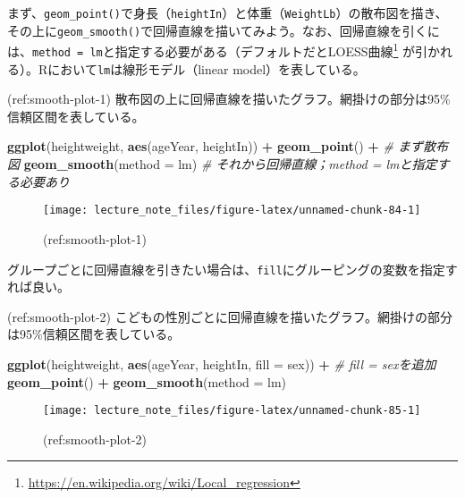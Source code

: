 \documentclass[]{book}
\newenvironment{Shaded}{\begin{snugshade}}{\end{snugshade}}
\newcommand{\KeywordTok}[1]{\textcolor[rgb]{0.13,0.29,0.53}{\textbf{#1}}}
\newcommand{\DataTypeTok}[1]{\textcolor[rgb]{0.13,0.29,0.53}{#1}}
\newcommand{\StringTok}[1]{\textcolor[rgb]{0.31,0.60,0.02}{#1}}
\newcommand{\CommentTok}[1]{\textcolor[rgb]{0.56,0.35,0.01}{\textit{#1}}}
\newcommand{\OperatorTok}[1]{\textcolor[rgb]{0.81,0.36,0.00}{\textbf{#1}}}
\newcommand{\NormalTok}[1]{#1}
\let\rmarkdownfootnote\footnote%
\def\footnote{\protect\rmarkdownfootnote}
\begin{document}
まず、\texttt{geom\_point()}で身長（\texttt{heightIn}）と体重（\texttt{WeightLb}）の散布図を描き、その上に\texttt{geom\_smooth()}で回帰直線を描いてみよう。なお、回帰直線を引くには、\texttt{method\ =\ lm}と指定する必要がある（デフォルトだとLOESS曲線\footnote{\url{https://en.wikipedia.org/wiki/Local_regression}}
が引かれる）。Rにおいて\texttt{lm}は線形モデル（linear
model）を表している。

(ref:smooth-plot-1)
散布図の上に回帰直線を描いたグラフ。網掛けの部分は95\%信頼区間を表している。

\begin{Shaded}
\begin{Highlighting}[]
\KeywordTok{ggplot}\NormalTok{(heightweight, }\KeywordTok{aes}\NormalTok{(ageYear, heightIn)) }\OperatorTok{+}
\StringTok{  }\KeywordTok{geom_point}\NormalTok{() }\OperatorTok{+}\StringTok{ }\CommentTok{# まず散布図}
\StringTok{  }\KeywordTok{geom_smooth}\NormalTok{(}\DataTypeTok{method =}\NormalTok{ lm) }\CommentTok{# それから回帰直線；method = lmと指定する必要あり}
\end{Highlighting}
\end{Shaded}

\begin{figure}

{\centering \texttt{[image: lecture\_note\_files/figure-latex/unnamed-chunk-84-1]} 

}

\caption{(ref:smooth-plot-1)}\label{fig:unnamed-chunk-84}
\end{figure}

グループごとに回帰直線を引きたい場合は、\texttt{fill}にグルーピングの変数を指定すれば良い。

(ref:smooth-plot-2)
こどもの性別ごとに回帰直線を描いたグラフ。網掛けの部分は95\%信頼区間を表している。

\begin{Shaded}
\begin{Highlighting}[]
\KeywordTok{ggplot}\NormalTok{(heightweight, }\KeywordTok{aes}\NormalTok{(ageYear, heightIn, }\DataTypeTok{fill =}\NormalTok{ sex)) }\OperatorTok{+}\StringTok{ }\CommentTok{# fill = sexを追加}
\StringTok{  }\KeywordTok{geom_point}\NormalTok{() }\OperatorTok{+}
\StringTok{  }\KeywordTok{geom_smooth}\NormalTok{(}\DataTypeTok{method =}\NormalTok{ lm)}
\end{Highlighting}
\end{Shaded}

\begin{figure}

{\centering \texttt{[image: lecture\_note\_files/figure-latex/unnamed-chunk-85-1]} 

}

\caption{(ref:smooth-plot-2)}\label{fig:unnamed-chunk-85}
\end{figure}
\end{document}
